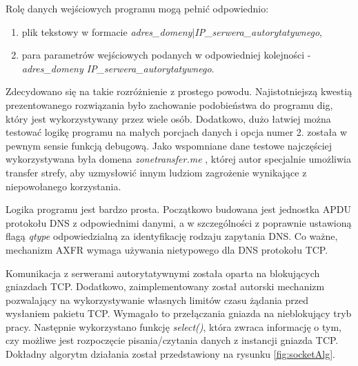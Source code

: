 Rolę danych wejściowych programu mogą pełnić odpowiednio:
\begin{enumerate}
	\item plik tekstowy w formacie \textit{adres\_domeny}|\textit{IP\_serwera\_autorytatywnego},
	\item para parametrów wejściowych podanych w odpowiedniej kolejności - \textit{adres\_domeny IP\_serwera\_autorytatywnego}.
\end{enumerate}
Zdecydowano się na takie rozróżnienie z prostego powodu. Najistotniejszą kwestią prezentowanego rozwiązania było
zachowanie podobieństwa do programu dig, który jest wykorzystywany przez wiele osób. Dodatkowo, dużo łatwiej można testować
logikę programu na małych
porcjach danych i opcja numer 2. została w pewnym sensie funkcją debugową. Jako wspomniane dane testowe najczęściej wykorzystywana
była domena \textit{zonetransfer.me} \cite{zonetransfer}, której autor specjalnie umożliwia transfer strefy, aby uzmysłowić innym
ludziom zagrożenie wynikające z niepowołanego korzystania.

Logika programu jest bardzo prosta. Początkowo budowana jest jednostka APDU protokołu DNS z odpowiednimi danymi, a w szczególności
z poprawnie ustawioną flagą \textit{qtype} odpowiedzialną za identyfikację rodzaju zapytania DNS. Co ważne, mechanizm AXFR wymaga
używania nietypowego dla DNS protokołu TCP.

Komunikacja z serwerami autorytatywnymi została oparta na blokujących gniazdach TCP. Dodatkowo, zaimplementowany został autorski
mechanizm pozwalający na wykorzystywanie własnych limitów czasu żądania przed wysłaniem pakietu TCP. Wymagało to przełączania
gniazda na nieblokujący tryb pracy. Następnie wykorzystano funkcję \textit{select()}, która zwraca informację o tym, czy możliwe jest
rozpoczęcie pisania/czytania danych z instancji gniazda TCP. Dokładny algorytm działania został przedstawiony na rysunku \ref{fig:socketAlg}.


